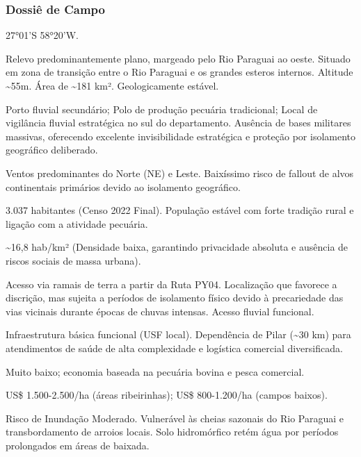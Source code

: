 \subsubsection{Dossiê de Campo}
\begin{description}[style=nextline,leftmargin=0.5cm,font=\bfseries]
\item[Coordenadas]  27°01'S 58°20'W.
\item[Topografia]  Relevo predominantemente plano, margeado pelo Rio Paraguai ao oeste. Situado em zona de transição entre o Rio Paraguai e os grandes esteros internos. Altitude \textasciitilde 55m. Área de \textasciitilde 181 km². Geologicamente estável.
\item[Alvos Estratégicos]  Porto fluvial secundário; Polo de produção pecuária tradicional; Local de vigilância fluvial estratégica no sul do departamento. Ausência de bases militares massivas, oferecendo excelente invisibilidade estratégica e proteção por isolamento geográfico deliberado.
\item[Fallout]  Ventos predominantes do Norte (NE) e Leste. Baixíssimo risco de fallout de alvos continentais primários devido ao isolamento geográfico.
\item[População]  3.037 habitantes (Censo 2022 Final). População estável com forte tradição rural e ligação com a atividade pecuária.
\item[Densidade]  \textasciitilde 16,8 hab/\allowbreak km² (Densidade baixa, garantindo privacidade absoluta e ausência de riscos sociais de massa urbana).
\item[Vias de Acesso]  Acesso via ramais de terra a partir da Ruta PY04. Localização que favorece a discrição, mas sujeita a períodos de isolamento físico devido à precariedade das vias vicinais durante épocas de chuvas intensas. Acesso fluvial funcional.
\item[Serviços]  Infraestrutura básica funcional (USF local). Dependência de Pilar (\textasciitilde 30 km) para atendimentos de saúde de alta complexidade e logística comercial diversificada.
\item[Custo de Vida]  Muito baixo; economia baseada na pecuária bovina e pesca comercial.
\item[Preço da Terra]  US\$ 1.500-2.500/\allowbreak ha (áreas ribeirinhas); US\$ 800-1.200/\allowbreak ha (campos baixos).
\item[Hidrologia]  Risco de Inundação Moderado. Vulnerável às cheias sazonais do Rio Paraguai e transbordamento de arroios locais. Solo hidromórfico retém água por períodos prolongados em áreas de baixada.

\end{description}
